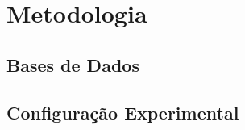 \chapter{Metodologia}
\label{c.metodologia}

\section{Bases de Dados}
\label{s.dataset}

\section{Configuração Experimental}
\label{s.experimental_setup}
